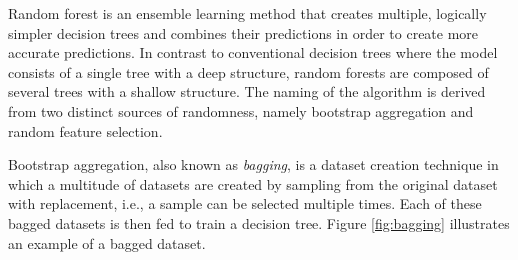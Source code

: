 Random forest is an ensemble learning method that creates multiple, logically simpler decision trees and combines their predictions in order to create more accurate predictions. In contrast to conventional decision trees where the model consists of a single tree with a deep structure, random forests are composed of several trees with a shallow structure. The naming of the algorithm is derived from two distinct sources of randomness, namely bootstrap aggregation and random feature selection.

Bootstrap aggregation, also known as \emph{bagging}, is a dataset creation technique in which a multitude of datasets are created by sampling from the original dataset with replacement, i.e., a sample can be selected multiple times. Each of these bagged datasets is then fed to train a decision tree. Figure \ref{fig:bagging} illustrates an example of a bagged dataset.

